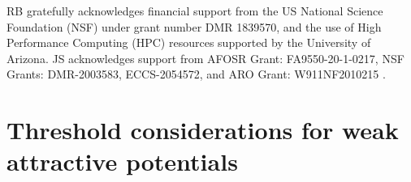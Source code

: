 \documentclass[aps,prb,superscriptaddress,letterpaper,amsmath,amssymb,twocolumn,preprintnumbers]{revtex4}
\newcommand\revisionB[1]{\textcolor{black}{#1}}
\begin{document}
\begin{acknowledgments}


RB gratefully acknowledges
financial support from the US National Science Foundation (NSF) under grant number DMR 1839570,
and the use of High Performance Computing (HPC) resources supported by the University of Arizona.
%
JS acknowledges support from AFOSR Grant: FA9550-20-1-0217, NSF Grants: DMR-2003583, ECCS-2054572, and ARO Grant: W911NF2010215 .




\end{acknowledgments}








\appendix


\section{Threshold considerations for weak attractive potentials}
\label{app:threshold}
\end{document}
